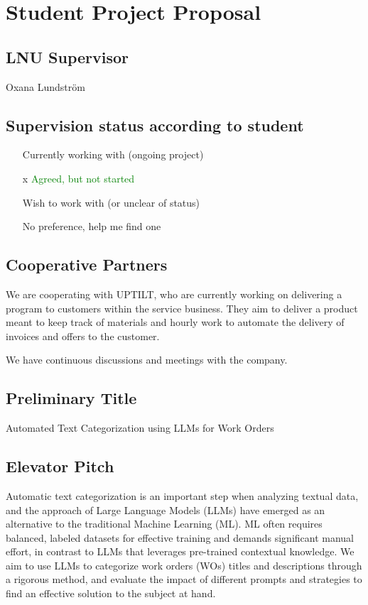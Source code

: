 \section{Student Project Proposal}

\subsection{LNU Supervisor}
Oxana Lundström

\subsection{Supervision status according to student}

\begin{itemize}
      \item [ ] Currently working with (ongoing project)
      \item [x] \textcolor{green}{Agreed, but not started}
      \item [ ] Wish to work with (or unclear of status)
      \item [ ] No preference, help me find one
\end{itemize}

\subsection{Cooperative Partners}

We are cooperating with UPTILT, who are currently working on delivering a program
to customers within the service business.
They aim to deliver a product meant to keep track of materials and hourly work
to automate the delivery of invoices and offers to the customer.

We have continuous discussions and meetings with the company.

\subsection{Preliminary Title}

Automated Text Categorization using LLMs for Work Orders

\subsection{Elevator Pitch}

Automatic text categorization is an important step when analyzing textual data,
and the approach of Large Language Models (LLMs) have emerged as an alternative
to the traditional Machine Learning (ML).
ML often requires balanced, labeled datasets for effective training
and demands significant manual effort, in contrast to LLMs that
leverages pre-trained contextual knowledge.
We aim to use LLMs to categorize work orders (WOs) titles and descriptions
through a rigorous method,
and evaluate the impact of different prompts and strategies to find
an effective solution to the subject at hand.

